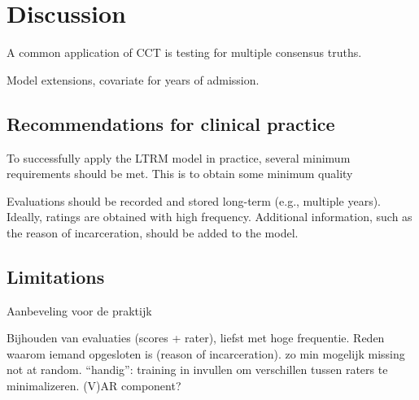 \documentclass{article}
\begin{document}
\section*{Discussion}


A common application of CCT is testing for multiple consensus truths.

Model extensions, covariate for years of admission.

\subsection*{Recommendations for clinical practice}
To successfully apply the LTRM model in practice, several minimum requirements should be met. This is to obtain some minimum quality

Evaluations should be recorded and stored long-term (e.g., multiple years). Ideally, ratings are obtained with high frequency. Additional information, such as the reason of incarceration, should be added to the model.


\subsection*{Limitations}

Aanbeveling voor de praktijk

Bijhouden van evaluaties (scores + rater), liefst met hoge frequentie. 
Reden waarom iemand opgesloten is (reason of incarceration).
zo min mogelijk missing not at random.
``handig'': training in invullen om verschillen tussen raters te minimalizeren.
(V)AR component?




\newpage
\appendix
\end{document}
